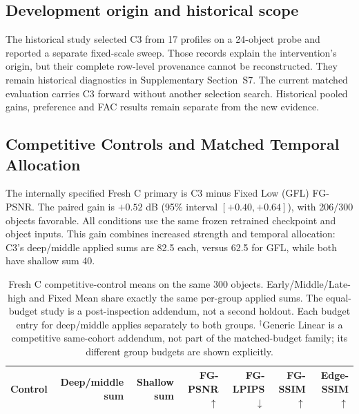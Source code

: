 \documentclass[times,twocolumn,final]{elsarticle}
\begin{document}
\subsection{Development origin and historical scope}
\label{subsec:c3}
The historical study selected C3 from 17 profiles on a 24-object probe and reported a separate fixed-scale sweep. Those records explain the intervention's origin, but their complete row-level provenance cannot be reconstructed. They remain historical diagnostics in Supplementary Section~S7. The current matched evaluation carries C3 forward without another selection search. Historical pooled gains, preference and FAC results remain separate from the new evidence.

\subsection{Competitive Controls and Matched Temporal Allocation}
\label{subsec:largescale}

The internally specified Fresh C primary is C3 minus Fixed Low (GFL) FG-PSNR. The paired gain is $+0.52$ dB (95\% interval $[+0.40,+0.64]$), with 206/300 objects favorable. All conditions use the same frozen retrained checkpoint and object inputs. This gain combines increased strength and temporal allocation: C3's deep/middle applied sums are 82.5 each, versus 62.5 for GFL, while both have shallow sum 40.

\begin{table}[t]
\centering\scriptsize\setlength{\tabcolsep}{4pt}
\caption{Fresh C competitive-control means on the same 300 objects. Early/Middle/Late-high and Fixed Mean share exactly the same per-group applied sums. The equal-budget study is a post-inspection addendum, not a second holdout. Each budget entry for deep/middle applies separately to both groups. $^\dagger$Generic Linear is a competitive same-cohort addendum, not part of the matched-budget family; its different group budgets are shown explicitly.}
\label{tab:freshc-absolute}\label{tab:matched-budget300}
\begin{tabular}{lrrrrrr}
\toprule Control & Deep/middle sum & Shallow sum & FG-PSNR$\uparrow$ & FG-LPIPS$\downarrow$ & FG-SSIM$\uparrow$ & Edge-SSIM$\uparrow$ \\
\midrule

\bottomrule
\end{tabular}
\end{table}
\end{document}
